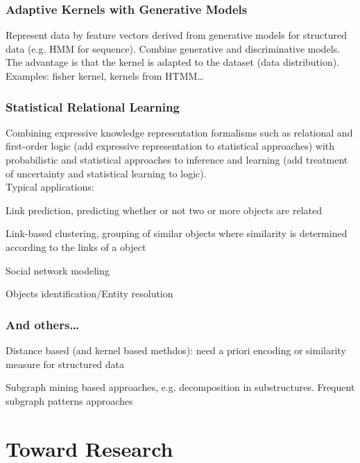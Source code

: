 \documentclass[10pt]{report}
\begin{document}
\subsubsection{Adaptive Kernels with Generative Models}
Represent data by feature vectors derived from generative models for structured data (e.g. HMM for sequence). Combine generative and discriminative models. The advantage is that the kernel is adapted to the dataset (data distribution).\\
Examples: fisher kernel, kernels from HTMM\ldots
\subsubsection{Statistical Relational Learning}
Combining expressive knowledge representation formalisms such as relational and first-order logic (add expressive representation to statistical approaches) with probabilistic and statistical approaches to inference and learning (add treatment of uncertainty and statistical learning to logic).\\
Typical applications:
\begin{list}{}{}
	\item Link prediction, predicting whether or not two or more objects are related
	\item Link-based clustering, grouping of similar objects where similarity is determined according to the links of a object
	\item Social network modeling
	\item Objects identification/Entity resolution
\end{list}
\subsubsection{And others\ldots}
\begin{list}{}{}
	\item Distance based (and kernel based methdos): need a priori encoding or similarity measure for structured data
	\item Subgraph mining based approaches, e.g. decomposition in substructures. Frequent subgraph patterns approaches
\end{list}
\section{Toward Research}
\end{document}
